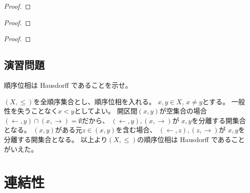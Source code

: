 \documentclass[report]{jlreq}
\begin{document}
\begin{proof}
    \TODO{}
\end{proof}

\begin{theorem}
    \TODO{}
\end{theorem}

\begin{proof}
    \TODO{}
\end{proof}

\begin{theorem}[開被覆の縮小可能性]
    \TODO{}
\end{theorem}

\begin{proof}
    \TODO{}
\end{proof}

%
\section{演習問題}

\begin{problem}
    順序位相は Hausdorff であることを示せ。
\end{problem}

\begin{answer}
    $(X, \le)$を全順序集合とし、順序位相を入れる。
    $x, y \in X, \, x \neq y$とする。
    一般性を失うことなく$x < y$としてよい。
    開区間$(x, y)$が空集合の場合
    $(\leftarrow, y) \cap (x, \rightarrow) = \emptyset$だから、
    $(\leftarrow, y), (x, \rightarrow)$が
    $x, y$を分離する開集合となる。
    $(x, y)$がある元$z \in (x, y)$を含む場合、
    $(\leftarrow, z), (z, \rightarrow)$が
    $x, y$を分離する開集合となる。
    以上より$(X, \le)$の順序位相は Hausdorff であることがいえた。
\end{answer}



%
\chapter{連結性}
\end{document}

